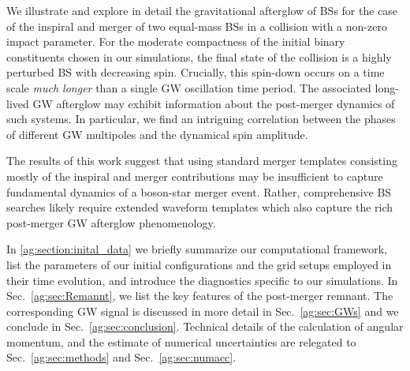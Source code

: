 We illustrate and explore in detail the gravitational afterglow
of BSs for the case of the inspiral and merger
of two equal-mass BSs in a collision with a non-zero impact parameter. For the moderate compactness of the initial binary constituents chosen in our simulations, the final state of the collision
is a highly perturbed BS with decreasing spin. Crucially, this spin-down occurs on a time scale {\it much longer} than a single GW oscillation time period.  The associated long-lived GW afterglow may exhibit information about the post-merger dynamics of such systems. In particular, we find an intriguing correlation between the phases of different GW multipoles and the dynamical spin amplitude.



The results of this work suggest that using standard merger templates consisting mostly of the inspiral and merger contributions may be insufficient to capture fundamental dynamics of a boson-star merger event. Rather, comprehensive BS searches likely require extended waveform templates which also capture the rich post-merger GW afterglow phenomenology.

In \ref{ag:section:inital_data} we
briefly summarize our computational framework, list the parameters
of our initial configurations and the grid setups employed in their
time evolution, and introduce the diagnostics specific
to our simulations. In Sec.~\ref{ag:sec:Remannt},
we list the key features of the post-merger
remnant. The corresponding GW signal is discussed in more detail
in Sec.~\ref{ag:sec:GWs} and we conclude in Sec.~\ref{ag:sec:conclusion}.
Technical details of the calculation
of angular momentum, and the estimate of numerical uncertainties
are relegated to
Sec.~\ref{ag:sec:methods} and Sec.~\ref{ag:sec:numacc}.

